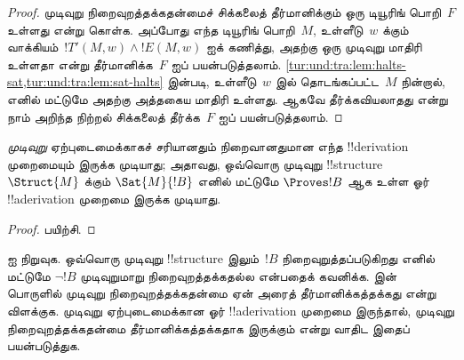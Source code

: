 \documentclass[../../../include/open-logic-section]{subfiles}
\begin{document}
\begin{proof}
  முடிவுறு நிறைவுறத்தக்கதன்மைச் சிக்கலைத் தீர்மானிக்கும் ஒரு டியூரிங்
  பொறி~$F$ உள்ளது என்று கொள்க. அப்போது எந்த டியூரிங் பொறி~$M$,
  உள்ளீடு~$w$ க்கும் வாக்கியம்~$!T'(M,w) \land !E(M,w)$ ஐக்
  கணித்து, அதற்கு ஒரு முடிவுறு மாதிரி உள்ளதா என்று தீர்மானிக்க~$F$ ஐப்
  பயன்படுத்தலாம். \cref{tur:und:tra:lem:halts-sat,tur:und:tra:lem:sat-halts}
  இன்படி, உள்ளீடு~$w$ இல் தொடங்கப்பட்ட~$M$ நின்றால், எனில் மட்டுமே
  அதற்கு அத்தகைய மாதிரி உள்ளது. ஆகவே தீர்க்கவியலாதது என்று நாம்
  அறிந்த நிற்றல் சிக்கலைத் தீர்க்க~$F$ ஐப் பயன்படுத்தலாம்.
\end{proof}

\begin{cor}%
  \emph{முடிவுறு} ஏற்புடைமைக்காகச் சரியானதும் நிறைவானதுமான எந்த
  !!{derivation} முறைமையும் இருக்க முடியாது; அதாவது, ஒவ்வொரு முடிவுறு
  !!{structure}~$\Struct{M}$ க்கும்
  $\Sat{M}{!B}$ எனில் மட்டுமே $\Proves !B$ ஆக உள்ள
  ஓர் !!a{derivation} முறைமை இருக்க முடியாது.
\end{cor}

\begin{proof}
  பயிற்சி.
\end{proof}

\begin{prob}
   ஐ நிறுவுக. ஒவ்வொரு முடிவுறு
  !!{structure} இலும்~$!B$ நிறைவுறுத்தப்படுகிறது எனில் மட்டுமே
  $\lnot !B$ முடிவுறுமாறு நிறைவுறத்தக்கதல்ல என்பதைக் கவனிக்க.
   இன் பொருளில் முடிவுறு
  நிறைவுறத்தக்கதன்மை ஏன் அரைத் தீர்மானிக்கத்தக்கது என்று விளக்குக.
  முடிவுறு ஏற்புடைமைக்கான ஓர் !!a{derivation} முறைமை இருந்தால்,
  முடிவுறு நிறைவுறத்தக்கதன்மை தீர்மானிக்கத்தக்கதாக இருக்கும் என்று
  வாதிட இதைப் பயன்படுத்துக.
\end{prob}
\end{document}
